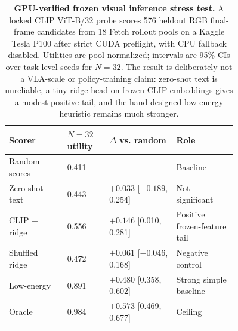 \begin{table}[t]
\centering
\scriptsize
\setlength{\tabcolsep}{3pt}
\begin{tabular}{p{0.20\linewidth}p{0.12\linewidth}p{0.23\linewidth}p{0.21\linewidth}}
\toprule
Scorer & $N=32$ utility & $\Delta$ vs. random & Role \\
\midrule
Random scores & 0.411 & -- & Baseline \\
Zero-shot text & 0.443 & $+0.033$ [$-0.189$, 0.254] & Not significant \\
CLIP + ridge & 0.556 & $+0.146$ [0.010, 0.281] & Positive frozen-feature tail \\
Shuffled ridge & 0.472 & $+0.061$ [$-0.046$, 0.168] & Negative control \\
Low-energy & 0.891 & $+0.480$ [0.358, 0.602] & Strong simple baseline \\
Oracle & 0.984 & $+0.573$ [0.469, 0.677] & Ceiling \\
\bottomrule
\end{tabular}
\caption{\textbf{GPU-verified frozen visual inference stress test.} A locked CLIP ViT-B/32 probe scores 576 heldout RGB final-frame candidates from 18 Fetch rollout pools on a Kaggle Tesla P100 after strict CUDA preflight, with CPU fallback disabled. Utilities are pool-normalized; intervals are 95\% CIs over task-level seeds for $N=32$. The result is deliberately not a VLA-scale or policy-training claim: zero-shot text is unreliable, a tiny ridge head on frozen CLIP embeddings gives a modest positive tail, and the hand-designed low-energy heuristic remains much stronger.}
\label{tab:frozen-visual-inference}
\end{table}
